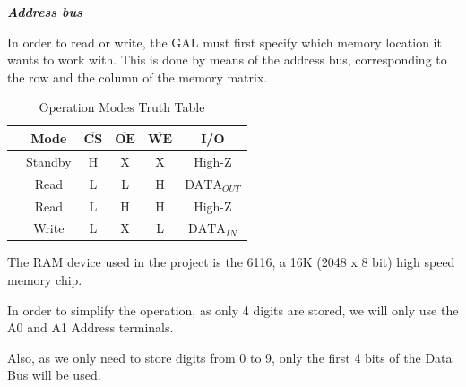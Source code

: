 \medskip
{\large \textit{\textbf{Address bus}}}
\medskip


In order to read or write, the GAL must first specify which memory location it wants to work with. This is done by means of the address bus, corresponding to the row and the column of the memory matrix. 

\begin{table}[H]
    \centering
        \begin{tabular}[t]{lccccc}
            \toprule
            & \textbf{Mode} & $\mathbf{\overline{CS}}$ & $\mathbf{\overline{OE}}$ & $\mathbf{\overline{WE}}$ & \textbf{I/O}\\
            \midrule
                &    Standby   &    H   &   X   &   X   &   High-Z        \\
                &    Read      &    L   &   L   &   H   &   $\text{DATA}_{OUT}$    \\
                &    Read      &    L   &   H   &   H   &   High-Z        \\
                &    Write     &    L   &   X   &   L   &   $\text{DATA}_{IN}$     \\
            \bottomrule
        \end{tabular}
        \caption{Operation Modes Truth Table ~\autocite{6116}}
        \label{table: RAM_MODES}
\end{table}


The RAM device used in the project is the 6116, a 16K (2048 x 8 bit) high speed memory chip.

In order to simplify the operation, as only 4 digits are stored, we will only use the A0 and A1 Address terminals. 

Also, as we only need to store digits from 0 to 9, only the first 4 bits of the Data Bus will be used.
